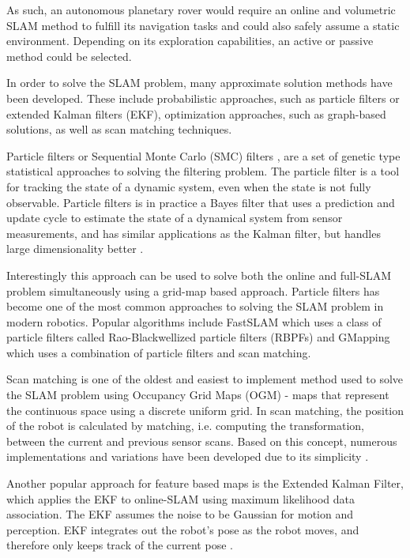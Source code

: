 As such, an autonomous planetary rover would require an online and volumetric
SLAM method to fulfill its navigation tasks and could also safely assume a
static environment.
Depending on its exploration capabilities, an active or passive method
could be selected.

In order to solve the SLAM problem, many approximate solution methods
have been developed.
These include probabilistic approaches, such as particle filters or extended
Kalman filters (EKF), optimization approaches, such as graph-based solutions,
as well as scan matching techniques.

Particle filters or Sequential Monte Carlo (SMC) filters
\parencite{Doucet2001, Murphy1999}, are a set of genetic type statistical
approaches to solving the filtering problem.
The particle filter is a tool for tracking the state of a dynamic system,
even when the state is not fully observable.
Particle filters is in practice a Bayes filter that uses a prediction
and update cycle to estimate the state of a dynamical system from
sensor measurements, and has similar applications as the Kalman filter,
but handles large dimensionality better \parencite{Thrun2005}.

Interestingly this approach can be used to solve both the online and
full-SLAM problem simultaneously using a grid-map based approach.
Particle filters has become one of the most common approaches to
solving the SLAM problem in modern robotics.
Popular algorithms include FastSLAM \parencite{Montemerlo2002} which
uses a class of particle filters called Rao-Blackwellized particle filters
(RBPFs) \parencite{Doucet2000, Murphy2001} and GMapping
\parencite{Grisettiyz2005} which uses a combination of particle filters
and scan matching.

Scan matching is one of the oldest and easiest to implement method used
to solve the SLAM problem using Occupancy Grid Maps (OGM) - maps that
represent the continuous space using a discrete uniform grid.
In scan matching, the position of the robot is calculated by matching,
i.e. computing the transformation, between the current and previous
sensor scans.
Based on this concept, numerous implementations and variations have
been developed due to its simplicity \parencite{Rusinkiewicz2001, Brenna2008}.

Another popular approach for feature based maps is the Extended Kalman Filter,
which applies the EKF to online-SLAM using maximum likelihood data association.
The EKF assumes the noise to be Gaussian for motion and perception.
EKF integrates out the robot's pose as the robot moves, and therefore only
keeps track of the current pose \parencite{Thrun2005}.

